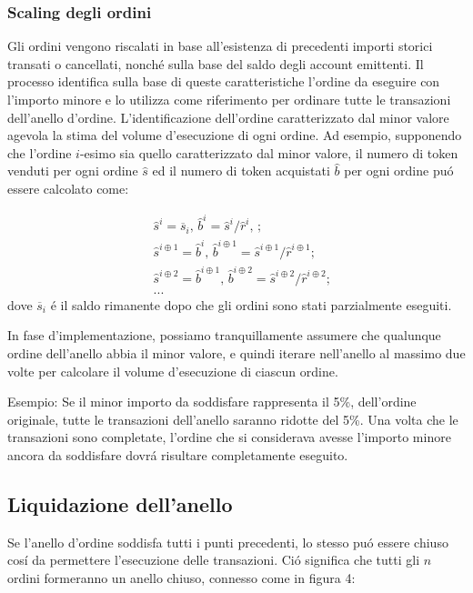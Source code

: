 \documentclass[UTF8,nofonts]{article}
\begin{document}
\begin{multicols}{2}
\subsubsection{Scaling degli ordini\label{sec:order_scaling}}
Gli ordini vengono riscalati in base all'esistenza di precedenti importi storici transati o cancellati, nonch\'e sulla base del saldo degli account emittenti. Il processo identifica sulla base di queste caratteristiche l'ordine da eseguire con l'importo minore e lo utilizza come riferimento per ordinare tutte le transazioni dell'anello d'ordine.
L'identificazione dell'ordine caratterizzato dal minor valore agevola la stima del volume d'esecuzione di ogni ordine. Ad esempio, supponendo che l'ordine $i$-esimo sia quello caratterizzato dal minor valore, il numero di token venduti per ogni ordine $\hat{s}$ ed il numero di token acquistati $\hat{b}$ per ogni ordine pu\'o essere calcolato come:

\[
\begin{split}
&\hat{s}^{i}=\overline{s}_i\text{, } \hat{b}^{i}=\hat{s}^{i}/ \hat{r}^i\text{, }\text{;}\\
&\hat{s}^{i\oplus 1}=\hat{b}^i\text{, } \hat{b}^{i\oplus 1}=\hat{s}^{i\oplus 1}/ \hat{r}^{i\oplus 1}\text{;}\\
&\hat{s}^{i\oplus 2}=\hat{b}^{i\oplus 1}\text{, } \hat{b}^{i\oplus 2}=\hat{s}^{i\oplus 2}/ \hat{r}^{i\oplus 2}\text{;}\\
& ...
\end{split}
\]
dove $\overline{s}_i$ \'e il saldo rimanente dopo che gli ordini sono stati parzialmente eseguiti.

In fase d'implementazione, possiamo tranquillamente assumere che qualunque ordine dell'anello abbia il minor valore, e quindi iterare nell'anello al massimo due volte per calcolare il volume d'esecuzione di ciascun ordine.

Esempio: Se il minor importo da soddisfare rappresenta il 5\%, dell'ordine originale, tutte le transazioni dell'anello saranno ridotte del 5\%. Una volta che le transazioni sono completate, l'ordine che si considerava avesse l'importo minore ancora da soddisfare dovr\'a  risultare completamente eseguito.

\subsection{Liquidazione dell'anello\label{sec:settlement}}

Se l'anello d'ordine soddisfa tutti i punti precedenti, lo stesso pu\'o essere chiuso cos\'i da permettere l'esecuzione delle transazioni. Ci\'o significa che tutti gli $n$ ordini formeranno un anello chiuso, connesso come in figura 4:


\end{multicols}
\end{document}
